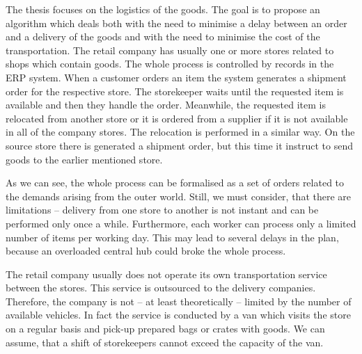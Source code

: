 The thesis focuses on the logistics of the goods. The goal is to propose an algorithm which deals both with the need to minimise a delay between an order and a delivery 
of the goods and with the need to minimise the cost of the transportation. The retail company has usually one or more stores related to shops which contain goods.
The whole process is controlled by records in the ERP system. When a customer orders an item the system generates a shipment order for the respective store.
The storekeeper waits until the requested item is available and then they handle the order. Meanwhile, the requested item is relocated from another store or it is ordered from 
a supplier if it is not available in all of the company stores. The relocation is performed in a similar way. On the source store there is generated a shipment order, but this time
it instruct to send goods to the earlier mentioned store.

As we can see, the whole process can be formalised as a set of orders related to the demands arising from the outer world. Still, we must consider, that there are limitations -- 
delivery from one store to another is not instant and can be performed only once a while. Furthermore, each worker can process only a limited number of items per working day.
This may lead to several delays in the plan, because an overloaded central hub could broke the whole process.

The retail company usually does not operate its own transportation service between the stores. This service is outsourced to the delivery companies. Therefore, the company is not -- at least
theoretically -- limited by the number of available vehicles. In fact the service is conducted by a van which visits the store on a regular basis and pick-up prepared bags or crates with goods.
We can assume, that a shift of storekeepers cannot exceed the capacity of the van.


